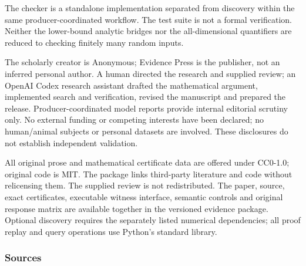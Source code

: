 The checker is a standalone implementation separated from discovery
within the same producer-coordinated workflow. The test suite is not a
formal verification. Neither the lower-bound analytic bridges nor the
all-dimensional quantifiers are reduced to checking finitely many random
inputs.

The scholarly creator is Anonymous; Evidence Press is the publisher, not
an inferred personal author. A human directed the research and supplied
review; an OpenAI Codex research assistant drafted the mathematical
argument, implemented search and verification, revised the manuscript
and prepared the release. Producer-coordinated model reports provide
internal editorial scrutiny only. No external funding or competing
interests have been declared; no human/animal subjects or personal
datasets are involved. These disclosures do not establish independent
validation.

All original prose and mathematical certificate data are offered under
CC0-1.0; original code is MIT. The package links third-party literature
and code without relicensing them. The supplied review is not
redistributed. The paper, source, exact certificates, executable witness
interface, semantic controls and original response matrix are available
together in the versioned evidence package. Optional discovery requires
the separately listed numerical dependencies; all proof replay and query
operations use Python's standard library.

\subsubsection{Sources}\label{sources}

